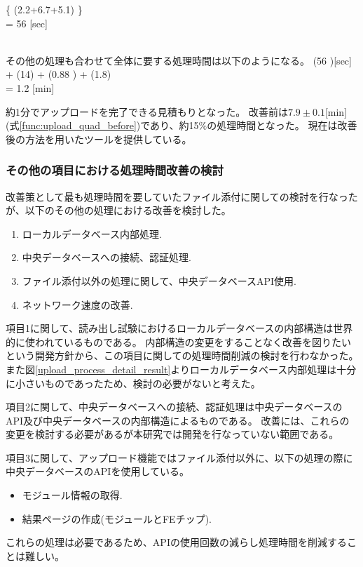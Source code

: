 \bbb
\left\{ (2.2+6.7+5.1) \pm {} \right\}  \nonumber \\
= 56   [{\rm sec}] \\\nonumber\\
\eee

その他の処理も合わせて全体に要する処理時間は以下のようになる。
\bbb
(56  )[\rm{sec}] + (14) + (0.88 ) + (1.8) \nonumber \\
= 1.2  [{\rm min}]
\eee

約1分でアップロードを完了できる見積もりとなった。
改善前は$7.9\pm 0.1$[min](式\ref{func:upload_quad_before})であり、約15$\%$の処理時間となった。
現在は改善後の方法を用いたツールを提供している。

\subsubsection{その他の項目における処理時間改善の検討}
改善策として最も処理時間を要していたファイル添付に関しての検討を行なったが、以下のその他の処理における改善を検討した。

\begin{enumerate}
  \item ローカルデータベース内部処理.
  \item 中央データベースへの接続、認証処理.
  \item ファイル添付以外の処理に関して、中央データベースAPI使用.
  \item ネットワーク速度の改善.
\end{enumerate}

項目1に関して、読み出し試験におけるローカルデータベースの内部構造は世界的に使われているものである。
内部構造の変更をすることなく改善を図りたいという開発方針から、この項目に関しての処理時間削減の検討を行わなかった。
また図\ref{upload_process_detail_result}よりローカルデータベース内部処理は十分に小さいものであったため、検討の必要がないと考えた。

項目2に関して、中央データベースへの接続、認証処理は中央データベースのAPI及び中央データベースの内部構造によるものである。
改善には、これらの変更を検討する必要があるが本研究では開発を行なっていない範囲である。

項目3に関して、アップロード機能ではファイル添付以外に、以下の処理の際に中央データベースのAPIを使用している。
\begin{itemize}
  \item モジュール情報の取得.
  \item 結果ページの作成(モジュールとFEチップ).
\end{itemize}
これらの処理は必要であるため、APIの使用回数の減らし処理時間を削減することは難しい。

